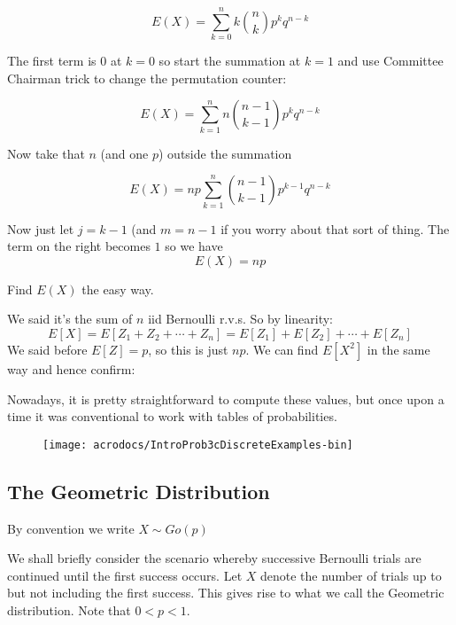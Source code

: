 \documentclass[12pt]{extbook}
\begin{document}
\begin{displaymath}
E(X) = \sum_{k=0}^n k \binom{n}{k} p^k q^{n-k}
\end{displaymath}

The first term is $0$ at $k=0$ so start the summation at $k=1$ and use Committee Chairman trick to change the permutation counter:

\begin{displaymath}
E(X) = \sum_{k=1}^n  n \binom{n-1}{k-1} p^k q^{n-k} 
\end{displaymath}

Now take that $n$ (and one $p$) outside the summation

\begin{displaymath}
E(X) = np \sum_{k=1}^n   \binom{n-1}{k-1} p^{k-1}q^{n-k}
\end{displaymath}

Now just let $j=k-1$ (and $m=n-1$ if you worry about that sort of thing.   The term on the right becomes $1$ so we have
\begin{displaymath}
E(X) = np
\end{displaymath}



Find $E(X)$ the easy way.

We said it's the sum of $n$ iid Bernoulli r.v.s.   So by linearity:
\begin{displaymath}
E[X] = E[Z_1 + Z_2 + \cdots + Z_n] = E[Z_1] + E[Z_2] + \cdots + E[Z_n]
\end{displaymath}
We said before $E[Z] = p$, so this is just $np$.   We can find $E[X^2]$ in the same way and hence confirm:



Nowadays, it is pretty straightforward to compute these values, but
once upon a time it was conventional to work with tables of
probabilities.  
\begin{figure}
\texttt{[image: acrodocs/IntroProb3cDiscreteExamples-bin]}
\end{figure}

\clearpage

\subsection{The Geometric Distribution}

{\color{green} By convention we write $X \sim Go(p)$} 

We shall briefly consider the scenario whereby successive Bernoulli trials are continued until the first success occurs.   Let $X$ denote the number of trials up to but not including the first success.   This gives rise to what we call the Geometric distribution.   Note that $0 < p < 1$.
\end{document}
